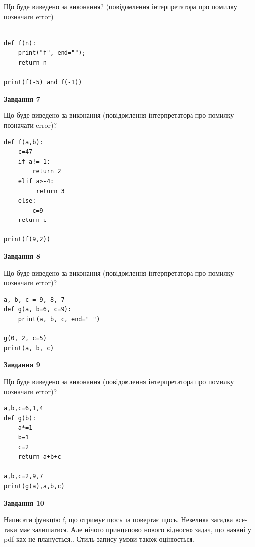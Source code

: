 \documentclass[12pt, ukrainian]{article}
\begin{document}
{\begin {large}
Що буде виведено за виконання? (повідомлення інтерпретатора про помилку позначати error)\par
\begin{verbatim}

def f(n):
    print("f", end="");
    return n

print(f(-5) and f(-1))
\end{verbatim}

{\begin {center}\textbf{Завдання 7}\end {center}}

Що буде виведено за виконання (повідомлення інтерпретатора про помилку позначати error)?\par
\begin{verbatim}
def f(a,b):
    c=47
    if a!=-1:
        return 2
    elif a>-4:
         return 3
    else: 
        c=9
    return c

print(f(9,2))
\end{verbatim}

{\begin {center}\textbf{Завдання 8}\end {center}}

Що буде виведено за виконання (повідомлення інтерпретатора про помилку позначати error)?\par
\begin{verbatim}
a, b, c = 9, 8, 7
def g(a, b=6, c=9):
    print(a, b, c, end=" ")

g(0, 2, c=5)
print(a, b, c)
\end{verbatim}

{\begin {center}\textbf{Завдання 9}\end {center}}

Що буде виведено за виконання (повідомлення інтерпретатора про помилку позначати error)?\par
\begin{verbatim}
a,b,c=6,1,4
def g(b):
    a*=1
    b=1
    c=2
    return a+b+c

a,b,c=2,9,7
print(g(a),a,b,c)
\end{verbatim}

{\begin {center}\textbf{Завдання 10}\end {center}}


Написати функцiю f, що отримує щось та повертає щось. Невелика загадка все-таки має залишатися. Але нічого принципово нового відносно задач, що наявні у pdf-ках не планується.. Стиль запису умови також оцінюється.\par
\end {large}}
\newpage
\end{document}
